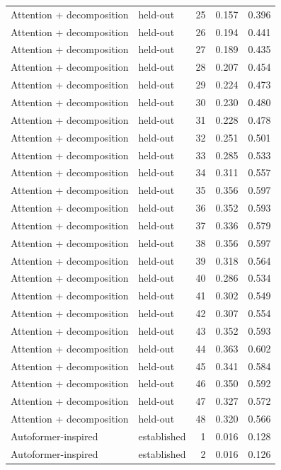 \begin{tabular}{llrrr}
Attention + decomposition & held-out & 25 & 0.157 & 0.396 \\
Attention + decomposition & held-out & 26 & 0.194 & 0.441 \\
Attention + decomposition & held-out & 27 & 0.189 & 0.435 \\
Attention + decomposition & held-out & 28 & 0.207 & 0.454 \\
Attention + decomposition & held-out & 29 & 0.224 & 0.473 \\
Attention + decomposition & held-out & 30 & 0.230 & 0.480 \\
Attention + decomposition & held-out & 31 & 0.228 & 0.478 \\
Attention + decomposition & held-out & 32 & 0.251 & 0.501 \\
Attention + decomposition & held-out & 33 & 0.285 & 0.533 \\
Attention + decomposition & held-out & 34 & 0.311 & 0.557 \\
Attention + decomposition & held-out & 35 & 0.356 & 0.597 \\
Attention + decomposition & held-out & 36 & 0.352 & 0.593 \\
Attention + decomposition & held-out & 37 & 0.336 & 0.579 \\
Attention + decomposition & held-out & 38 & 0.356 & 0.597 \\
Attention + decomposition & held-out & 39 & 0.318 & 0.564 \\
Attention + decomposition & held-out & 40 & 0.286 & 0.534 \\
Attention + decomposition & held-out & 41 & 0.302 & 0.549 \\
Attention + decomposition & held-out & 42 & 0.307 & 0.554 \\
Attention + decomposition & held-out & 43 & 0.352 & 0.593 \\
Attention + decomposition & held-out & 44 & 0.363 & 0.602 \\
Attention + decomposition & held-out & 45 & 0.341 & 0.584 \\
Attention + decomposition & held-out & 46 & 0.350 & 0.592 \\
Attention + decomposition & held-out & 47 & 0.327 & 0.572 \\
Attention + decomposition & held-out & 48 & 0.320 & 0.566 \\
Autoformer-inspired & established & 1 & 0.016 & 0.128 \\
Autoformer-inspired & established & 2 & 0.016 & 0.126 \\

\end{tabular}
